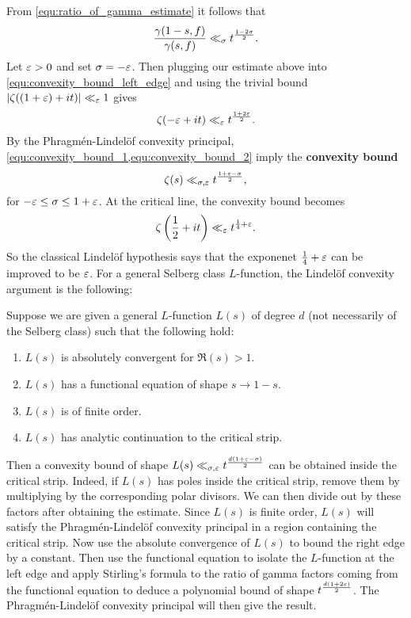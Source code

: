    From \cref{equ:ratio_of_gamma_estimate} it follows that
    \[
      \frac{\gamma(1-s,f)}{\gamma(s,f)} \ll_{\sigma} t^{\frac{1-2\sigma}{2}}.
    \]
    Let $\varepsilon > 0$ and set $\sigma = -\varepsilon$. Then plugging our estimate above into \cref{equ:convexity_bound_left_edge} and using the trivial bound $|\zeta((1+\varepsilon)+it)| \ll_{\varepsilon} 1$ gives
    \begin{equation}\label{equ:convexity_bound_2}
      \zeta(-\varepsilon+it) \ll_{\varepsilon} t^{\frac{1+2\varepsilon}{2}}.
    \end{equation}
    By the Phragm\'en-Lindel\"of convexity principal, \cref{equ:convexity_bound_1,equ:convexity_bound_2} imply the \textbf{convexity bound}
    \[
      \zeta(s) \ll_{\sigma,\varepsilon} t^{\frac{1+\varepsilon-\sigma}{2}},
    \]
    for $-\varepsilon \le \sigma \le 1+\varepsilon$. At the critical line, the convexity bound becomes
    \begin{equation}\label{equ:convexity_bound_zeta_function}
      \zeta\left(\frac{1}{2}+it\right) \ll_{\varepsilon} t^{\frac{1}{4}+\varepsilon}.
    \end{equation}
    So the classical Lindel\"of hypothesis says that the exponenet $\frac{1}{4}+\varepsilon$ can be improved to be $\varepsilon$. For a general Selberg class $L$-function, the Lindel\"of convexity argument is the following:

    \begin{method}
      Suppose we are given a general $L$-function $L(s)$ of degree $d$ (not necessarily of the Selberg class) such that the following hold:
      \begin{enumerate}[label=(\roman*)]
        \item $L(s)$ is absolutely convergent for $\Re(s) > 1$.
        \item $L(s)$ has a functional equation of shape $s \to 1-s$.
        \item $L(s)$ is of finite order.
        \item $L(s)$ has analytic continuation to the critical strip.
      \end{enumerate}
      Then a convexity bound of shape $L(s) \ll_{\sigma,\varepsilon} t^{\frac{d(1+\varepsilon-\sigma)}{2}}$ can be obtained inside the critical strip. Indeed, if $L(s)$ has poles inside the critical strip, remove them by multiplying by the corresponding polar divisors. We can then divide out by these factors after obtaining the estimate. Since $L(s)$ is finite order, $L(s)$ will satisfy the Phragm\'en-Lindel\"of convexity principal in a region containing the critical strip. Now use the absolute convergence of $L(s)$ to bound the right edge by a constant. Then use the functional equation to isolate the $L$-function at the left edge and apply Stirling's formula to the ratio of gamma factors coming from the functional equation to deduce a polynomial bound of shape $t^{\frac{d(1+2\varepsilon)}{2}}$. The Phragm\'en-Lindel\"of convexity principal will then give the result.
    \end{method}

